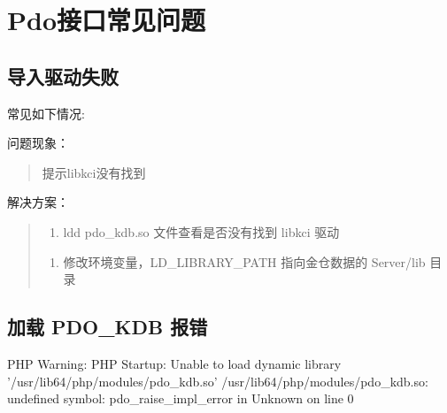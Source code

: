 \documentclass[letterpaper,10pt,english]{sphinxmanual}
\begin{document}
\section{Pdo接口常见问题}
\label{\detokenize{interface/pdo:pdo}}\label{\detokenize{interface/pdo::doc}}

\subsection{导入驱动失败}
\label{\detokenize{interface/pdo:id1}}
常见如下情况:
\begin{quote}

\begin{figure}[htbp]
\centering

\noindent{}
\end{figure}
\end{quote}

问题现象：
\begin{quote}

提示libkci没有找到
\end{quote}

解决方案：
\begin{quote}
\begin{enumerate}
%
\item {} 
ldd pdo\_kdb.so 文件查看是否没有找到 libkci 驱动

\end{enumerate}

\begin{figure}[htbp]
\centering

\noindent{}
\end{figure}
\begin{enumerate}
%
\setcounter{enumi}{1}
\item {} 
修改环境变量，LD\_LIBRARY\_PATH 指向金仓数据的 Server/lib 目录

\end{enumerate}

\begin{sphinxVerbatim}[commandchars=\\\{\}]
 
\end{sphinxVerbatim}
\end{quote}


\subsection{加载 PDO\_KDB 报错}
\label{\detokenize{interface/pdo:pdo-kdb}}
PHP Warning:  PHP Startup: Unable to load dynamic library '/usr/lib64/php/modules/pdo\_kdb.so' \sphinxhyphen{} /usr/lib64/php/modules/pdo\_kdb.so: undefined symbol: pdo\_raise\_impl\_error in Unknown on line 0
\end{document}
